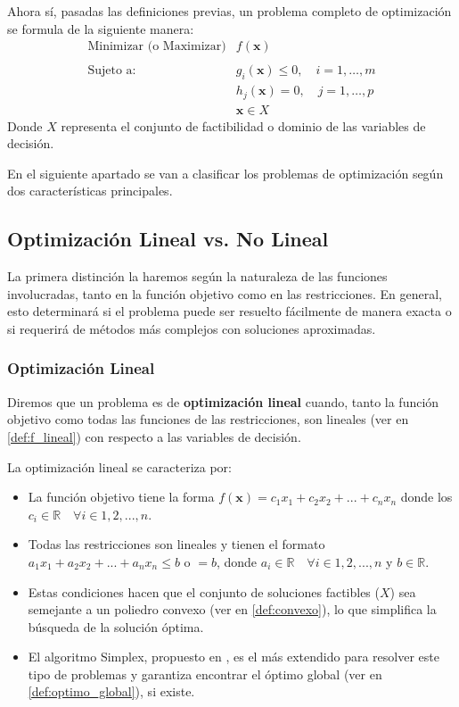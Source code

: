 \documentclass[12pt,a4paper]{book}
\begin{document}
Ahora sí, pasadas las definiciones previas, un problema completo de optimización se formula de la siguiente manera:
$$
\begin{array}{ll}
\text{Minimizar (o Maximizar)} & f(\mathbf{x}) \\ \\
\text{Sujeto a:} & g_i(\mathbf{x}) \le 0, \quad i = 1, \ldots, m \\
& h_j(\mathbf{x}) = 0, \quad j = 1, \ldots, p \\
& \mathbf{x} \in X
\end{array}
$$
Donde $X$ representa el conjunto de factibilidad o dominio de las variables de decisión.

En el siguiente apartado se van a clasificar los problemas de optimización según dos características principales.

\subsection{Optimización Lineal vs. No Lineal}

La primera distinción la haremos según la naturaleza de las funciones involucradas, tanto en la función objetivo como en las restricciones. En general, esto determinará si el problema puede ser resuelto fácilmente de manera exacta o si requerirá de métodos más complejos con soluciones aproximadas.

\subsubsection{Optimización Lineal}
Diremos que un problema es de \textbf{optimización lineal} cuando, tanto la función objetivo como todas las funciones de las restricciones, son lineales (ver en \ref{def:f_lineal}) con respecto a las variables de decisión. 

La optimización lineal se caracteriza por:
\begin{itemize}
    \item La función objetivo tiene la forma $f(\mathbf{x})=c_1x_1+c_2x_2+...+c_nx_n$ donde los $c_i \in \mathbb{R} \quad \forall i \in 1,2,...,n$.
    \item Todas las restricciones son lineales y tienen el formato $a_1x_1+a_2x_2+...+a_nx_n\leq b$ o $=b$, donde $a_i \in \mathbb{R} \quad \forall i \in 1,2,...,n$ y $b\in \mathbb{R}$.
    \item Estas condiciones hacen que el conjunto de soluciones factibles ($X$) sea semejante a un poliedro convexo (ver en \ref{def:convexo}), lo que simplifica la búsqueda de la solución óptima.
    \item El algoritmo Simplex, propuesto en \cite{Dantzig1951}, es el más extendido para resolver este tipo de problemas y garantiza encontrar el óptimo global (ver en \ref{def:optimo_global}), si existe.
\end{itemize}
\end{document}
